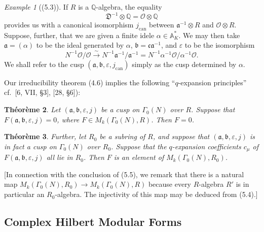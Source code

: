 \documentclass[12pt,a4paper]{article}
\theoremstyle{plain}
\newtheorem{theorem}{Th\'{e}or\`{e}me}[section]
\theoremstyle{definition}
\theoremstyle{remark}
\newtheorem{example}[theorem]{Example}
\newenvironment{namedtheorem}[1][]{%
  \renewcommand{\thetheorem}{#1}%
  \theoremstyle{plain}%
  \begin{theorem}%
}{\end{theorem}\renewcommand{\thetheorem}{\arabic{section}.\arabic{theorem}}}
\begin{document}
\begin{example}[(5.3)]
If $R$ is a $\mathbb{Q}$-algebra, the equality
\[
\mathfrak{D}^{-1} \otimes \mathbb{Q} = \mathcal{O} \otimes \mathbb{Q}
\]
provides us with a canonical isomorphism $j_{\mathrm{can}}$ between $\mathfrak{a}^{-1} \otimes R$ and $\mathcal{O} \otimes R$. Suppose, further, that we are given a finite idele $\alpha \in \mathbb{A}_K^*$. We may then take $\mathfrak{a} = (\alpha)$ to be the ideal generated by $\alpha$, $\mathfrak{b} = \mathfrak{c}\mathfrak{a}^{-1}$, and $\varepsilon$ to be the isomorphism
\[
N^{-1}\mathcal{O}/\mathcal{O} \xrightarrow{\sim} N^{-1}\mathfrak{a}^{-1}/\mathfrak{a}^{-1} = N^{-1}\alpha^{-1}\mathcal{O}/\alpha^{-1}\mathcal{O}.
\]
We shall refer to the cusp $(\mathfrak{a}, \mathfrak{b}, \varepsilon, j_{\mathrm{can}})$ simply as the cusp determined by $\alpha$.
\end{example}

Our irreducibility theorem (4.6) implies the following ``$q$-expansion principles'' cf.~[6, VII, \S3], [28, \S6]):

\begin{namedtheorem}[(5.4)]
Let $(\mathfrak{a}, \mathfrak{b}, \varepsilon, j)$ be a cusp on $\Gamma_0(N)$ over $R$. Suppose that $F(\mathfrak{a}, \mathfrak{b}, \varepsilon, j) = 0$, where $F \in M_k(\Gamma_0(N), R)$. Then $F = 0$.
\end{namedtheorem}

\begin{namedtheorem}[(5.5)]
Further, let $R_0$ be a subring of $R$, and suppose that $(\mathfrak{a}, \mathfrak{b}, \varepsilon, j)$ is in fact a cusp on $\Gamma_0(N)$ over $R_0$. Suppose that the $q$-expansion coefficients $c_\mu$ of $F(\mathfrak{a}, \mathfrak{b}, \varepsilon, j)$ all lie in $R_0$. Then $F$ is an element of $M_k(\Gamma_0(N), R_0)$.
\end{namedtheorem}

[In connection with the conclusion of (5.5), we remark that there is a natural map $M_k(\Gamma_0(N), R_0) \to M_k(\Gamma_0(N), R)$ because every $R$-algebra $R'$ is in particular an $R_0$-algebra. The injectivity of this map may be deduced from (5.4).]

\subsection*{Complex Hilbert Modular Forms}
\end{document}
